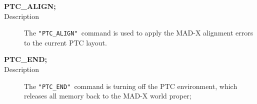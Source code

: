 \begin{description}
	\item[\textbf{PTC\_ALIGN;}] 
	\item[Description] 
The \texttt{"PTC\_ALIGN" }command is used to apply the MAD-X alignment  errors to the current PTC layout.
\end{description}

\begin{description}
	\item[\textbf{PTC\_END;}] 
	\item[Description] 
The \texttt{"PTC\_END" }command  is turning off the PTC environment,  which releases all memory back to the MAD-X world proper;
\end{description}

